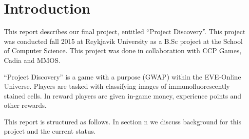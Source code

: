 \section{Introduction}\label{sec:introduction}
This report describes our final project, entitled ``Project Discovery''. This
project was conducted fall 2015 at Reykjavik University as a B.Sc project at
the School of Computer Science. This project was done in collaboration with CCP
Games, Cadia and MMOS.

``Project Discovery'' is a game with a purpose (GWAP) within the EVE-Online
Universe. Players are tasked with classifying images of immunofluorescently
stained cells. In reward players are given in-game money, experience points and
other rewards.

This report is structured as follows. In section n we discuss background for
this project and the current status.










